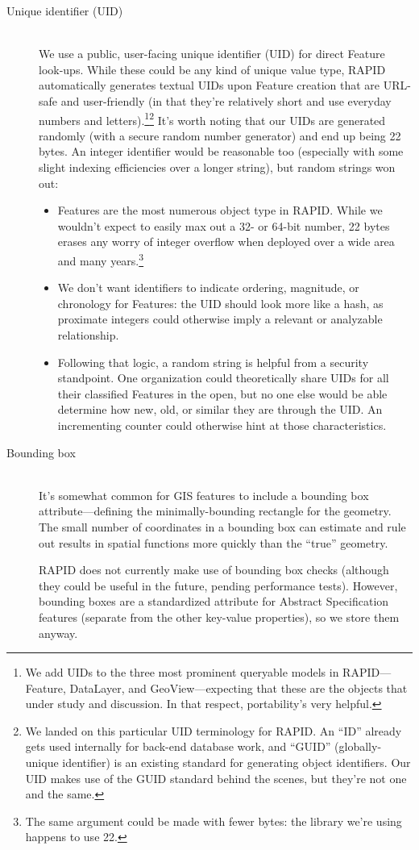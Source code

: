 \begin{description}
  \item[Unique identifier (UID)] \hfill \\
  We use a public, user-facing unique identifier (UID) for direct Feature look-ups. While these could be any kind of unique value type, RAPID automatically generates textual UIDs upon Feature creation that are URL-safe and user-friendly (in that they're relatively short and use everyday numbers and letters).\footnote{We add UIDs to the three most prominent queryable models in RAPID---Feature, DataLayer, and GeoView---expecting that these are the objects that under study and discussion. In that respect, portability's very helpful.}\footnote{We landed on this particular UID terminology for RAPID. An ``ID'' already gets used internally for back-end database work, and ``GUID'' (globally-unique identifier) is an existing standard for generating object identifiers. Our UID makes use of the GUID standard behind the scenes, but they're not one and the same.} It's worth noting that our UIDs are generated randomly (with a secure random number generator) and end up being 22 bytes. An integer identifier would be reasonable too (especially with some slight indexing efficiencies over a longer string), but random strings won out:
  
  \begin{itemize}
  \item Features are the most numerous object type in RAPID. While we wouldn't expect to easily max out a 32- or 64-bit number, 22 bytes erases any worry of integer overflow when deployed over a wide area and many years.\footnote{The same argument could be made with fewer bytes: the library we're using happens to use 22.}
  \item We don't want identifiers to indicate ordering, magnitude, or chronology for Features: the UID should look more like a hash, as proximate integers could otherwise imply a relevant or analyzable relationship.
  \item Following that logic, a random string is helpful from a security standpoint. One organization could theoretically share UIDs for all their classified Features in the open, but no one else would be able determine how new, old, or similar they are through the UID. An incrementing counter could otherwise hint at those characteristics.
\end{itemize}
  
\item[Bounding box] \hfill \\
  It's somewhat common for GIS features to include a bounding box attribute---defining the minimally-bounding rectangle for the geometry. The small number of coordinates in a bounding box can estimate and rule out results in spatial functions more quickly than the ``true'' geometry.

  RAPID does not currently make use of bounding box checks (although they could be useful in the future, pending performance tests). However, bounding boxes are a standardized attribute for Abstract Specification features (separate from the other key-value properties), so we store them anyway.
  
\end{description}


